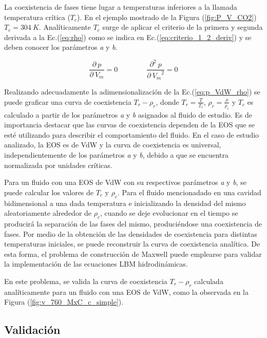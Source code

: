 La coexistencia de fases tiene lugar a temperaturas inferiores a la llamada temperatura crítica ($T_c$). En el ejemplo mostrado de la Figura (\ref{fig:P_V_CO2}) $T_c = 304 \> K$. Analíticamente $T_c$ surge de aplicar el criterio de la primera y segunda derivada a la Ec.(\ref{eq:rho}) como se indica en Ec.(\ref{eq:criterio_1_2_deriv}) y se deben conocer los parámetros \textit{a} y \textit{b}.

\begin{equation}
	\frac{\partial\> p}{\partial\> V_{m}} = 0 \qquad \qquad \frac{\partial^{2} \> p}{\partial\> {V_{m}}^{2}} = 0
	\label{eq:criterio_1_2_deriv}
\end{equation}

Realizando adecuadamente la adimensionalización  de la Ec.(\ref{eq:p_VdW_rho}) se puede graficar una curva de coexistencia $T_r - \rho_r$, donde $T_r = \frac{T}{T_c}$, $\rho_r = \frac{\rho}{\rho_c}$ y $T_c$ es calculado a partir de los parámetros \textit{a} y \textit{b} asignados al fluido de estudio. Es de importancia destacar que las curvas de coexistencia dependen de la EOS que se esté utilizando para describir el comportamiento del fluido. En el caso de estudio analizado, la EOS es de VdW y la curva de coexistencia es universal, independientemente de los parámetros \textit{a} y \textit{b}, debido a que se encuentra normalizada por unidades críticas.

Para un fluido con una EOS de VdW con su respectivos parámetros \textit{a} y \textit{b}, se puede calcular los valores de $T_c$ y $\rho_c$. Para  el fluido mencionadado en una cavidad bidimensional a una dada temperatura e inicializando la densidad del mismo aleatoriamente alrededor de  $\rho_c$, cuando se deje evolucionar en el tiempo se producirá la separación de las fases del mismo, produciéndose una coexistencia de fases. Por medio de la obtención de las densidades de coexistencia para distintas temperaturas iniciales, se puede reconstruir la curva de coexistencia analítica. De esta forma, el problema de construcción de Maxwell puede emplearse para validar la implementación de las ecuaciones LBM hidrodinámicas.

En este problema, se valida la curva de coexistencia $T_r - \rho_r$ calculada analíticamente para un fluido con una EOS de VdW, como la observada en la Figura (\ref{fig:v_760_MxC_c_simple}). 

\subsection{Validación}

